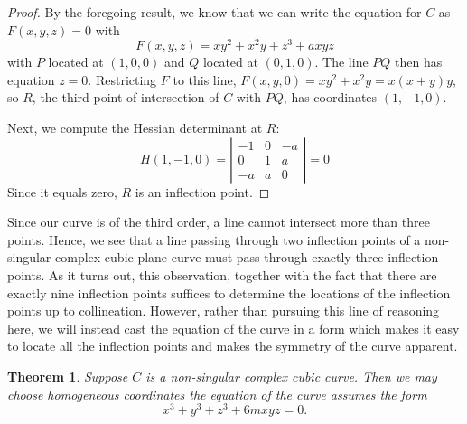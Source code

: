 \documentclass[12pt]{article}
\newtheorem{thm}{Theorem}
\begin{document}
\begin{proof}
By the foregoing result, we know that we can write the
equation for $C$ as $F(x,y,z) = 0$ with
\[
 F(x,y,z) = x y^2 + x^2 y + z^3 + a xyz 
\]
with $P$ located at $(1,0,0)$ and $Q$ located at $(0,1,0)$.
The line $PQ$ then has equation $z = 0$.  Restricting $F$
to this line, $F(x,y,0) = x y^2 + x^2 y = x (x + y) y$, so
$R$, the third point of intersection of $C$ with $PQ$, has
coordinates $(1,-1,0)$.  

Next, we compute the Hessian determinant at $R$:
\[
 H(1,-1,0) = \left| \begin{matrix}
   -1 & 0 & -a \\
    0 & 1 &  a \\
   -a & a &  0
 \end{matrix} \right| = 0
\]
Since it equals zero, $R$ is an inflection point.
\end{proof}

Since our curve is of the third order, a line cannot
intersect more than three points.  Hence, we see that
a line passing through two inflection points of a 
non-singular complex cubic plane curve must pass through
exactly three inflection points.  As it turns out, this 
observation, together with the fact that there are exactly 
nine inflection points suffices to determine the locations 
of the inflection points up to collineation.  However, rather
than pursuing this line of reasoning here, we will instead
cast the equation of  the curve in a form which makes it easy 
to locate all the inflection points and makes the symmetry 
of the curve apparent.

\begin{thm}
Suppose $C$ is a non-singular complex cubic curve.  Then we 
may choose homogeneous coordinates the equation of the curve
assumes the form
\[
 x^3 + y^3 + z^3 + 6mxyz = 0.
\]
\end{thm}
\end{document}
